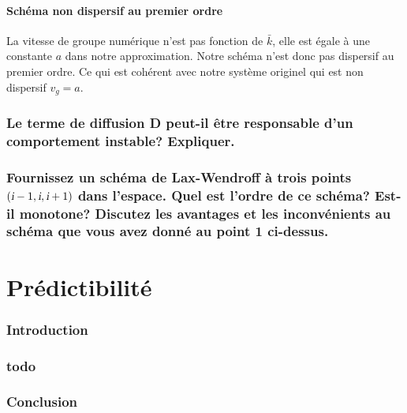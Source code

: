 \documentclass[a4paper, 12pt]{report}
\begin{document}
\subsection*{Schéma non dispersif au premier ordre}

La vitesse de groupe numérique n'est pas fonction de $\bar{k}$,
elle est égale à une constante $a$ dans notre approximation.
Notre schéma n'est donc pas dispersif au premier ordre.
Ce qui est cohérent avec notre système originel qui est non dispersif $v_{g} = a $.


\section{Le terme de diffusion D peut-il être responsable d'un comportement instable? Expliquer.}

\section{Fournissez un schéma de Lax-Wendroff à trois points $\left(\textsl{i}-1,\textsl{i},\textsl{i}+1\right)$ dans l'espace. Quel est l'ordre de ce schéma? Est-il monotone? Discutez les avantages et les inconvénients au schéma que vous avez donné au point 1 ci-dessus.}



\part{Prédictibilité}
\setcounter{section}{0}

\section*{Introduction}


\section{todo}


\section*{Conclusion}
\end{document}
